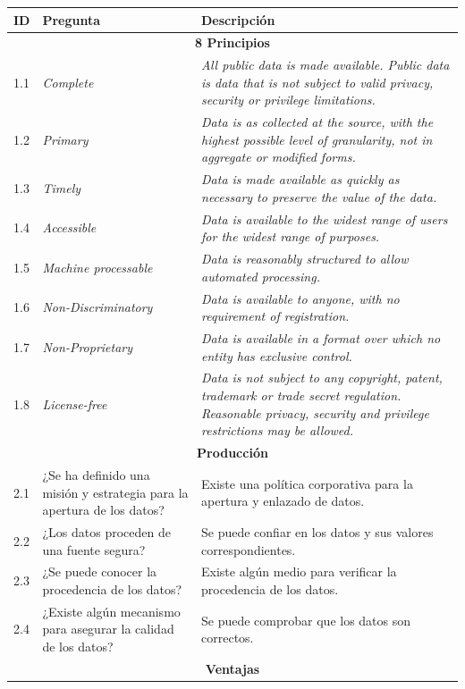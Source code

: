 \begin{longtable}[c]{|l|p{7cm}|p{8cm}|} 
\hline
  \textbf{ID} & \textbf{Pregunta} &  \textbf{Descripción} \\\hline
\endhead
  \multicolumn{3}{|c|}{\textbf{8 Principios}}  \\ \hline
   1.1& \textit{Complete} & \textit{All public data is made available. Public data is data that is not subject to valid privacy, security or privilege limitations.}\\ \hline
   1.2&\textit{Primary} & \textit{Data is as collected at the source, with the highest possible level of granularity, not in aggregate or modified forms.}\\ \hline  
   1.3&\textit{Timely} & \textit{Data is made available as quickly as necessary to preserve the value of the data.}\\ \hline  
   1.4&\textit{Accessible} & \textit{Data is available to the widest range of users for the widest range of purposes.}\\ \hline  
   1.5&\textit{Machine processable} & \textit{Data is reasonably structured to allow automated processing.} \\ \hline  
   1.6&\textit{Non-Discriminatory} & \textit{Data is available to anyone, with no requirement of registration.}\\ \hline  
   1.7&\textit{Non-Proprietary} & \textit{Data is available in a format over which no entity has exclusive control.}\\ \hline
   1.8&\textit{License-free} & \textit{Data is not subject to any copyright, patent, trademark or trade secret regulation. Reasonable privacy, security and privilege restrictions may be allowed.}\\ \hline    
  \multicolumn{3}{|c|}{\textbf{Producción}}  \\ \hline
   2.1& ¿Se ha definido una misión y estrategia para la apertura de los datos? & Existe una política corporativa para la apertura y enlazado de datos.\\ \hline
   2.2& ¿Los datos proceden de una fuente segura? & Se puede confiar en los datos y sus valores correspondientes.\\ \hline
   2.3& ¿Se puede conocer la procedencia de los datos? & Existe algún medio para verificar la procedencia de los datos.\\ \hline    
   2.4& ¿Existe algún mecanismo para asegurar la calidad de los datos? & Se puede comprobar que los datos son correctos.\\ \hline  
  \multicolumn{3}{|c|}{\textbf{Ventajas}}  \\ \hline

\end{longtable}
